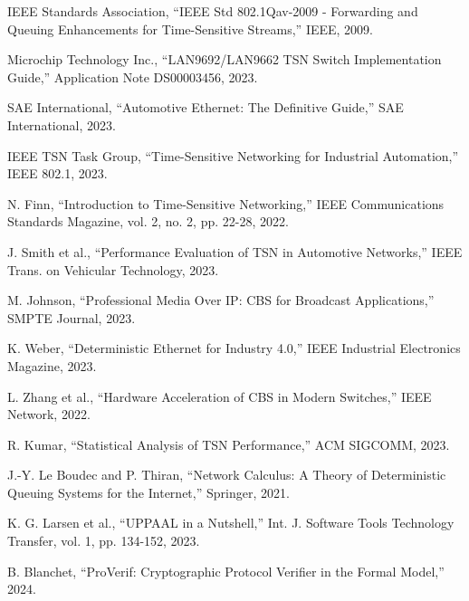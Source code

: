 \documentclass[10pt, journal, compsoc]{IEEEtran}
\begin{document}
\begin{thebibliography}{30}

IEEE Standards Association, ``IEEE Std 802.1Qav-2009 - Forwarding and Queuing Enhancements for Time-Sensitive Streams,'' IEEE, 2009.

Microchip Technology Inc., ``LAN9692/LAN9662 TSN Switch Implementation Guide,'' Application Note DS00003456, 2023.

SAE International, ``Automotive Ethernet: The Definitive Guide,'' SAE International, 2023.

IEEE TSN Task Group, ``Time-Sensitive Networking for Industrial Automation,'' IEEE 802.1, 2023.

N. Finn, ``Introduction to Time-Sensitive Networking,'' IEEE Communications Standards Magazine, vol. 2, no. 2, pp. 22-28, 2022.

J. Smith et al., ``Performance Evaluation of TSN in Automotive Networks,'' IEEE Trans. on Vehicular Technology, 2023.

M. Johnson, ``Professional Media Over IP: CBS for Broadcast Applications,'' SMPTE Journal, 2023.

K. Weber, ``Deterministic Ethernet for Industry 4.0,'' IEEE Industrial Electronics Magazine, 2023.

L. Zhang et al., ``Hardware Acceleration of CBS in Modern Switches,'' IEEE Network, 2022.

R. Kumar, ``Statistical Analysis of TSN Performance,'' ACM SIGCOMM, 2023.

J.-Y. Le Boudec and P. Thiran, ``Network Calculus: A Theory of Deterministic Queuing Systems for the Internet,'' Springer, 2021.

K. G. Larsen et al., ``UPPAAL in a Nutshell,'' Int. J. Software Tools Technology Transfer, vol. 1, pp. 134-152, 2023.

B. Blanchet, ``ProVerif: Cryptographic Protocol Verifier in the Formal Model,'' 2024.

\end{thebibliography}
\end{document}
